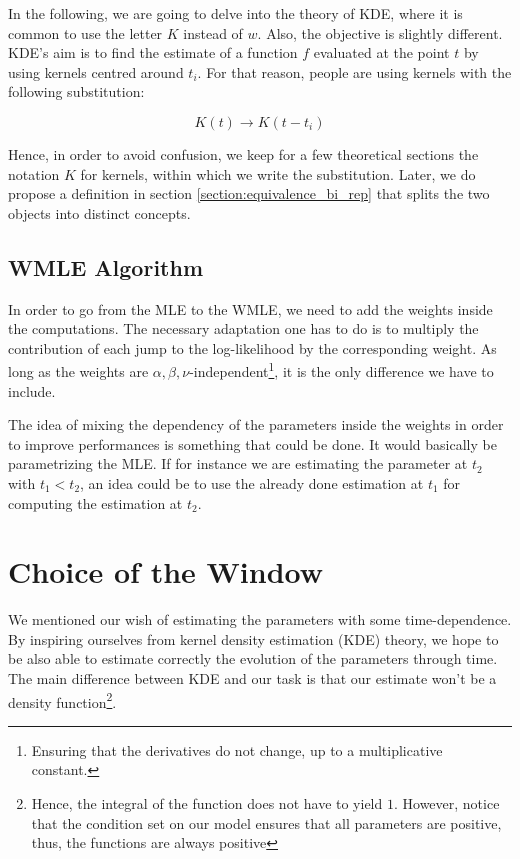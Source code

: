 \documentclass[11pt]{book}
\begin{document}
In the following, we are going to delve into the theory of KDE, where it is common to use the letter $K$ instead of $w$. Also, the objective is slightly different. KDE's aim is to find the estimate of a function $f$ evaluated at the point $t$ by using kernels centred around $t_i$. For that reason, people are using kernels with the following substitution:

$$ K(t) \to K(t - t_i)$$

Hence, in order to avoid confusion, we keep for a few theoretical sections the notation $K$ for kernels, within which we write the substitution. Later, we do propose a definition in section \ref{section:equivalence_bi_rep} that splits the two objects into distinct concepts.


\subsection{WMLE Algorithm}
In order to go from the MLE to the WMLE, we need to add the weights inside the computations. The necessary adaptation one has to do is to multiply the contribution of each jump to the log-likelihood by the corresponding weight. As long as the weights are $\alpha, \beta, \nu$-independent\footnote{Ensuring that the derivatives do not change, up to a multiplicative constant.}, it is the only difference we have to include.  

The idea of mixing the dependency of the parameters inside the weights in order to improve performances is something that could be done. It would basically be parametrizing the MLE. If for instance we are estimating the parameter at $t_2$ with $t_1 < t_2$, an idea could be to use the already done estimation at $t_1$ for computing the estimation at $t_2$.



\section{Choice of the Window}

We mentioned our wish of estimating the parameters with some time-dependence. By inspiring ourselves from kernel density estimation (KDE) theory, we hope to be also able to estimate correctly the evolution of the parameters through time. The main difference between KDE and our task is that our estimate won't be a density function\footnote{Hence, the integral of the function does not have to yield $1$. However, notice that the condition set on our model ensures that all parameters are positive, thus, the functions are always positive}. 
\end{document}
